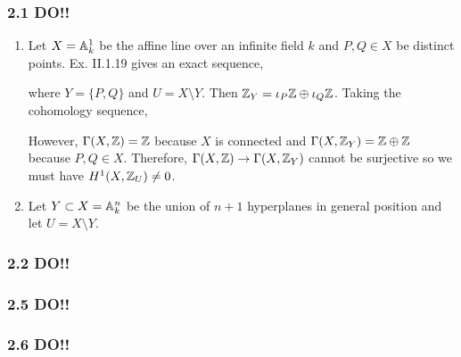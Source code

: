 \documentclass[12pt]{article}
\begin{document}
\subsubsection{2.1 DO!!}

\begin{enumerate}
\item Let $X = \mathbb{A}^1_k$ be the affine line over an infinite field $k$ and $P, Q \in X$ be distinct points. Ex. II.1.19 gives an exact sequence,
\begin{center}
\end{center}
where $Y = \{ P, Q \}$ and $U = X \setminus Y$. Then $\mathbb{Z}_Y = \iota_P \mathbb{Z} \oplus \iota_Q \mathbb{Z}$. Taking the cohomology sequence,
\begin{center}
\end{center}
However, $\Gamma(X, \mathbb{Z}) = \mathbb{Z}$ because $X$ is connected and $\Gamma(X, \mathbb{Z}_Y) = \mathbb{Z} \oplus \mathbb{Z}$ because $P, Q \in X$. Therefore, $\Gamma(X, \mathbb{Z}) \to \Gamma(X, \mathbb{Z}_Y)$ cannot be surjective so we must have $H^1(X, \mathbb{Z}_U) \neq 0$.

\item Let $Y \subset X = \mathbb{A}^n_k$ be the union of $n + 1$ hyperplanes in general position and let $U = X \setminus Y$. 
\end{enumerate}

\subsubsection{2.2 DO!!}

\subsubsection{2.5 DO!!}

\subsubsection{2.6 DO!!}
\end{document}
